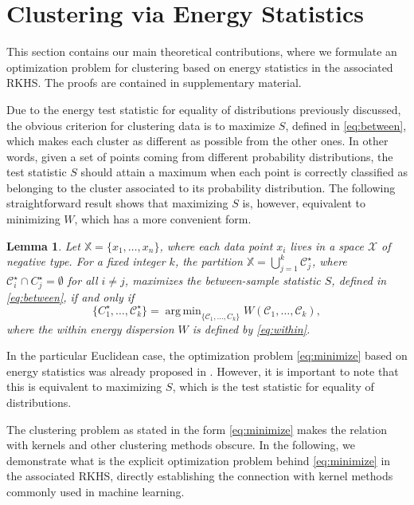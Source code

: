 \documentclass{article}
\newtheorem{lemma}[theorem]{Lemma}
\DeclareMathOperator*{\argmin}{arg\,min}
\newcommand\C{{\mathcal{C}}}
\begin{document}
\section{Clustering via Energy Statistics}
\label{sec:clustering_theory}

This section contains our main theoretical contributions, where 
we formulate an optimization problem for clustering 
based on energy statistics in the associated RKHS.
The proofs are contained in supplementary material.

Due to the energy test statistic for equality of distributions previously
discussed, the obvious
criterion for clustering data is to 
maximize $S$, defined in \eqref{eq:between}, which makes 
each cluster as different
as possible from the other ones.
In other words, given a set of points coming from different probability
distributions, the test statistic $S$ should attain a maximum when 
each point is correctly
classified as belonging to the cluster associated to its probability
distribution.
The following 
straightforward result
shows that maximizing $S$ is, however, equivalent to minimizing
$W$, which has a more convenient form.

\begin{lemma}
\label{th:minimize}
Let $\mathbb{X} = \{x_1,\dotsc,x_n\}$, where each data point
$x_i$ lives in a space $\mathcal{X}$ of negative type. 
For a fixed integer $k$,
the partition
$\mathbb{X} = \bigcup_{j=1}^k \C^\star_j$, where 
$\C^\star_i \cap C^\star_j = \emptyset$ for
all $i\ne j$, maximizes the between-sample statistic $S$, defined
in \eqref{eq:between}, if and only if
\begin{equation}
\label{eq:minimize}
\{C_1^\star, \dotsc,\C_k^\star\} = \argmin_{\{\C_1,\dotsc,C_k\}  } W(
\C_1, \dotsc, \C_k),
\end{equation}
where the within energy dispersion $W$ is defined by \eqref{eq:within}.
\end{lemma}

In the particular Euclidean case, 
the optimization problem \eqref{eq:minimize} based on
energy statistics was already proposed in \citet{Kgroups}. However, it is
important to note that this is equivalent to maximizing $S$,
which is the test statistic for equality of distributions. 

The clustering
problem as stated in the
form \eqref{eq:minimize} makes
the relation with kernels and other clustering methods obscure.
In the following, we demonstrate what is the explicit optimization 
problem behind 
\eqref{eq:minimize} in the associated RKHS, directly 
establishing the connection with kernel methods commonly used in machine
learning.
\end{document}
